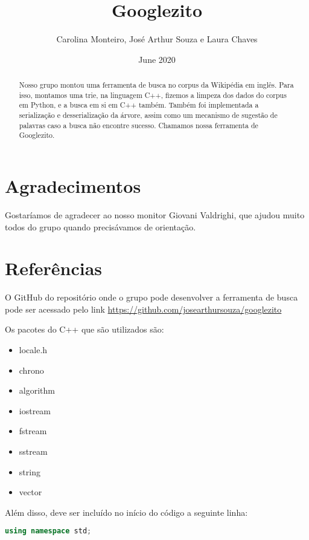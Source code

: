 \documentclass{article}
\title{Googlezito}
\author{Carolina Monteiro, José Arthur Souza e Laura Chaves }
\date{June 2020}
\begin{document}
\maketitle

\begin{abstract}
    
    Nosso grupo montou uma ferramenta de busca no corpus da Wikipédia em inglês. Para isso, montamos uma trie, na linguagem C++, fizemos a limpeza dos dados do corpus em Python, e a busca em si em C++ também. Também foi implementada a serialização e desserialização da árvore, assim como um mecanismo de sugestão de palavras caso a busca não encontre sucesso. Chamamos nossa ferramenta de Googlezito.
    
\end{abstract}

\section{Agradecimentos}

Gostaríamos de agradecer ao nosso monitor Giovani Valdrighi, que ajudou muito todos do grupo quando precisávamos de orientação.

\section{Referências}

O GitHub do repositório onde o grupo pode desenvolver a ferramenta de busca pode ser acessado pelo link \url{https://github.com/josearthursouza/googlezito}

Os pacotes do C++ que são utilizados são:

\begin{itemize}
    \item locale.h
    \item chrono
    \item algorithm
    \item iostream
    \item fstream
    \item sstream
    \item string
    \item vector
\end{itemize}

Além disso, deve ser incluído no início do código a seguinte linha:

\begin{lstlisting}[language=C++]
using namespace std;

\end{lstlisting}
\end{document}
